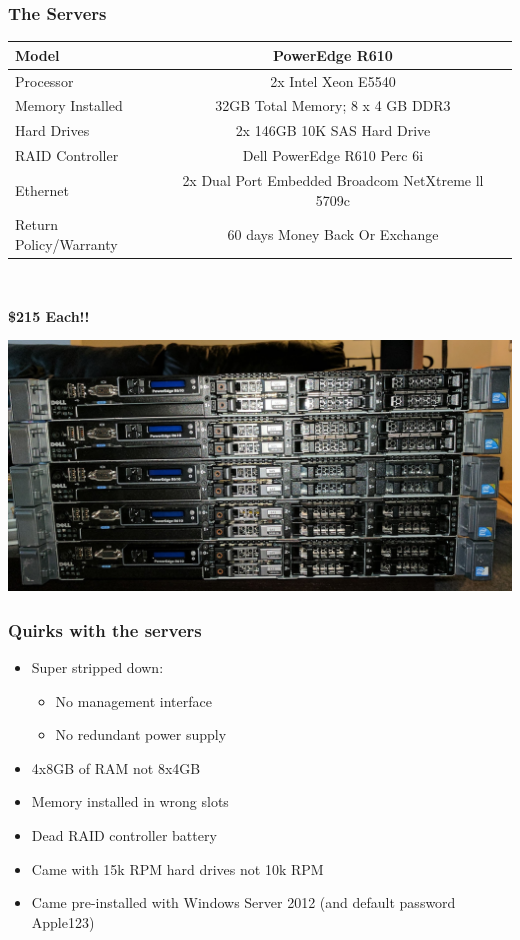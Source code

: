 \documentclass[aspectratio=169,11pt,hyperref={colorlinks=true}]{beamer}
\begin{document}
\begin{frame}
    \frametitle{The Servers}
    \begin{tabular}{ l c r }
        \hline
        Model &	PowerEdge R610 \\
        \hline
        Processor &	2x Intel Xeon E5540 \\
        \hline
        Memory Installed & 32GB Total Memory; 8 x 4 GB DDR3 \\
        \hline
        Hard Drives & 2x 146GB 10K SAS Hard Drive \\
        \hline
        RAID Controller & Dell PowerEdge R610 Perc 6i \\
        \hline
        Ethernet & 2x Dual Port Embedded Broadcom NetXtreme ll 5709c \\
        \hline
        Return Policy/Warranty & 60 days Money Back Or Exchange \\
        \hline
    \end{tabular}
    \\
    \begin{center}
        \Huge{\textbf{\$215 Each!!}}
    \end{center}
\end{frame}

\begin{frame}
    \includegraphics[width=\textwidth]{servers_delivered.jpg}  
\end{frame}

\begin{frame}
    \frametitle{Quirks with the servers}
    \begin{itemize}
        \item Super stripped down:
            \begin{itemize}
                \item No management interface
                \item No redundant power supply
            \end{itemize}
        \item 4x8GB of RAM not 8x4GB
        \item Memory installed in wrong slots
        \item Dead RAID controller battery
        \item Came with 15k RPM hard drives not 10k RPM
        \item Came pre-installed with Windows Server 2012 (and default password Apple123)
    \end{itemize}
\end{frame}
\end{document}
